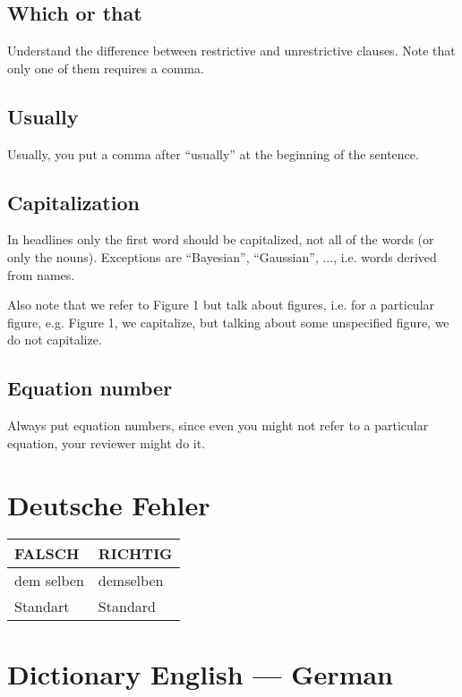 \documentclass{mlthesis}
\begin{document}
\subsection{Which or that}
Understand the difference between restrictive and unrestrictive
clauses.  Note that only one of them requires a comma.

\subsection{Usually}

Usually, you put a comma after ``usually'' at the beginning
of the sentence.

\subsection{Capitalization}

In headlines only the first word should be capitalized, not all of the
words (or only the nouns).  Exceptions are ``Bayesian'', ``Gaussian'',
..., i.e. words derived from names.

Also note that we refer to Figure 1 but talk about figures, i.e. for a
particular figure, e.g. Figure 1, we capitalize, but talking about
some unspecified figure, we do not capitalize.

\subsection{Equation number}

Always put equation numbers, since even you might not refer to a
particular equation, your reviewer might do it.

\section{Deutsche Fehler}
\begin{center}
  \begin{tabular}{|l|l|}
    FALSCH   & RICHTIG \\
    \hline
    dem selben    & demselben \\
    Standart      & Standard  \\
  \end{tabular}
\end{center}

\section{Dictionary English --- German}
  
\end{document}
